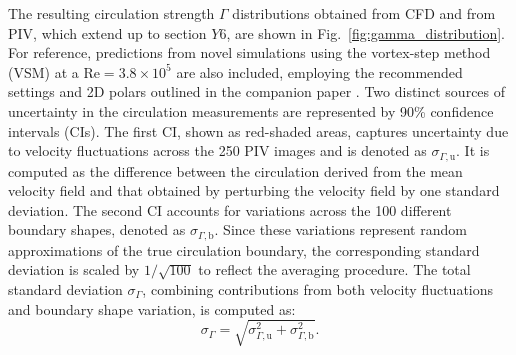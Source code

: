 \documentclass[wes, manuscript]{copernicus}
\begin{document}
The resulting circulation strength $\Gamma$ distributions obtained from CFD and from PIV, which extend up to section $Y6$, are shown in Fig.~\ref{fig:gamma_distribution}. For reference, predictions from novel simulations using the vortex-step method (VSM) at a $\textrm{Re} = 3.8 \times 10^5$ are also included, employing the recommended settings and 2D polars outlined in the companion paper \citep{Poland2025b}.
Two distinct sources of uncertainty in the circulation measurements are represented by 90\% confidence intervals (CIs). The first CI, shown as red-shaded areas, captures uncertainty due to velocity fluctuations across the 250 PIV images and is denoted as $\sigma_{\Gamma,\textrm{u}}$. It is computed as the difference between the circulation derived from the mean velocity field and that obtained by perturbing the velocity field by one standard deviation.
The second CI accounts for variations across the 100 different boundary shapes, denoted as $\sigma_{\Gamma,\textrm{b}}$. Since these variations represent random approximations of the true circulation boundary, the corresponding standard deviation is scaled by $1/\sqrt{100}$ to reflect the averaging procedure. The total standard deviation $\sigma_{\Gamma}$, combining contributions from both velocity fluctuations and boundary shape variation, is computed as:
\begin{equation}
    \sigma_{\Gamma} = \sqrt{\sigma_{\Gamma,\textrm{u}}^2 + \sigma_{\Gamma,\textrm{b}}^2}   .
\end{equation}
\end{document}
